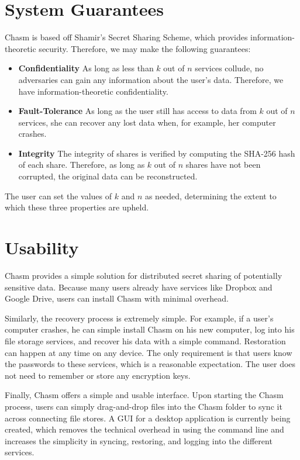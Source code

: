 \documentclass[letterpaper,twocolumn,10pt]{article}
\begin{document}
\section{System Guarantees}

Chasm is based off Shamir's Secret Sharing Scheme, which provides information-theoretic security. Therefore, we may make the following guarantees:

\begin{itemize}
\item \textbf{Confidentiality} As long as less than $k$ out of $n$ services collude, no adversaries can gain any information about the user's data. Therefore, we have information-theoretic confidentiality.
\item \textbf{Fault-Tolerance} As long as the user still has access to data from $k$ out of $n$ services, she can recover any lost data when, for example, her computer crashes.
\item \textbf{Integrity} The integrity of shares is verified by computing the SHA-256 hash of each share. Therefore, as long as $k$ out of $n$ shares have not been corrupted, the original data can be reconstructed.
\end{itemize}

The user can set the values of $k$ and $n$ as needed, determining the extent to which these three properties are upheld.

\section{Usability}

Chasm provides a simple solution for distributed secret sharing of potentially sensitive data. Because many users already have services like Dropbox and Google Drive, users can install Chasm with minimal overhead.

Similarly, the recovery process is extremely simple. For example, if a user's computer crashes, he can simple install Chasm on his new computer, log into his file storage services, and recover his data with a simple command. Restoration can happen at any time on any device. The only requirement is that users know the passwords to these services, which is a reasonable expectation. The user does not need to remember or store any encryption keys.

Finally, Chasm offers a simple and usable interface. Upon starting the Chasm process, users can simply drag-and-drop files into the Chasm folder to sync it across connecting file stores. A GUI for a desktop application is currently being created, which removes the technical overhead in using the command line and increases the simplicity in syncing, restoring, and logging into the different services.
\end{document}

